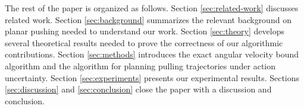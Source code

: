 \documentclass[conference]{IEEEtran}
\begin{document}
The rest of the paper is organized as follows. Section
\ref{sec:related-work} discusses related work. Section
\ref{sec:background} summarizes the relevant background on planar
pushing needed to understand our work. Section \ref{sec:theory}
develops several theoretical results needed to prove the correctness
of our algorithmic contributions. Section \ref{sec:methods} introduces
the exact angular velocity bound algorithm and the algorithm for
planning pulling trajectories under action uncertainty. Section
\ref{sec:experiments} presents our experimental results. Sections
\ref{sec:discussion} and \ref{sec:conclusion} close the paper with a
discussion and conclusion.














\end{document}
